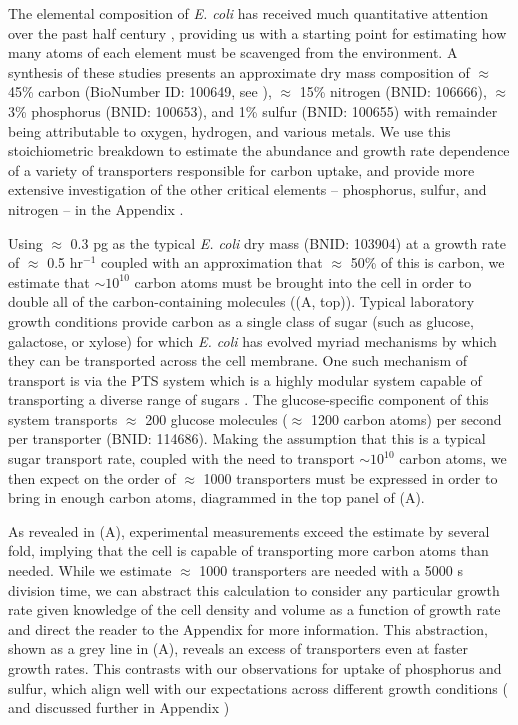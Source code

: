 The elemental composition of \textit{E. coli} has received much quantitative
attention over the past half century \citep{neidhardt1991,
taymaz-nikerel2010, heldal1985, bauer1976}, providing us with a starting
point for estimating how many atoms of each element must be scavenged from
the environment. A synthesis of these studies presents an approximate dry mass
composition of $\approx$ 45\% carbon (BioNumber ID:
100649, see ), $\approx$ 15\% nitrogen (BNID: 106666),
$\approx$ 3\% phosphorus (BNID: 100653), and 1\% sulfur (BNID: 100655) with
remainder being attributable to oxygen, hydrogen, and various metals.
We use this stoichiometric breakdown to estimate the abundance and growth
rate dependence of a variety of transporters responsible for carbon uptake,
and provide more extensive investigation of the other critical elements --
phosphorus, sulfur, and nitrogen -- in the Appendix .

Using $\approx$ 0.3 pg as the typical \textit{E. coli} dry mass (BNID: 103904)
at a growth rate of $\approx$ 0.5 hr$^{-1}$ coupled with an approximation that
$\approx$ 50\% of this is carbon, we estimate that $\sim 10^{10}$ carbon atoms must be
brought into the cell in order to double all of the carbon-containing molecules
((A, top)). Typical laboratory growth conditions provide
carbon as a single class of sugar (such as glucose, galactose, or xylose) for
which \textit{E. coli} has evolved myriad mechanisms by which they can be
transported across the cell membrane. One such mechanism of transport is via
the PTS system which is a highly modular system capable of transporting a
diverse range of sugars \citep{escalante2012}. The glucose-specific component of
this system transports $\approx$ 200 glucose molecules ($\approx$ 1200 carbon
atoms) per second per transporter (BNID: 114686). Making the assumption that this is a typical sugar
transport rate, coupled with the need to transport $\sim 10^{10}$ carbon atoms,
we then expect on the order of $\approx$ 1000 transporters must be expressed in order to
bring in enough carbon atoms, diagrammed in the top panel of
(A).

 As revealed in
(A), experimental measurements exceed the estimate by several
fold, implying that the cell is capable of transporting more carbon atoms than
needed. While we estimate $\approx$ 1000 transporters are needed with a
5000 s division time, we can abstract this calculation to consider any
particular growth rate given knowledge of the cell density and volume as a
function of growth rate and direct the reader to the Appendix
 for more information. This abstraction, shown as
a grey line in (A), reveals an excess of
transporters even at faster growth rates. This contrasts with our observations
for uptake of phosphorus and sulfur, which align well with our expectations across
different growth conditions ( and
discussed further in Appendix )

